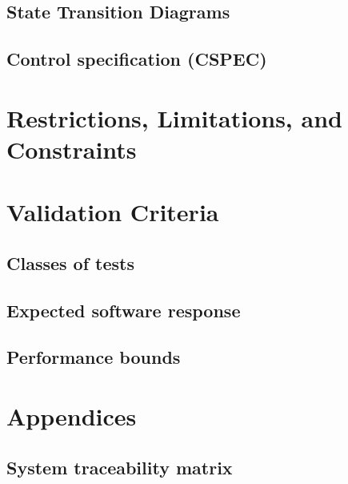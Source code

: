 \documentclass{article}
\begin{document}
\subsection{State Transition Diagrams}

\subsection{Control specification (CSPEC)}

\section{Restrictions, Limitations, and Constraints}

\section{Validation Criteria}

\subsection{Classes of tests}

\subsection{Expected software response}

\subsection{Performance bounds}

\section{Appendices}

\subsection{System traceability matrix}
\end{document}
